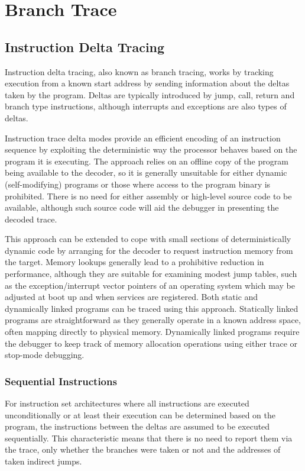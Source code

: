 \chapter{Branch Trace} \label{Branch Trace}


\section{Instruction Delta Tracing} \label{Delta Tracing}

Instruction delta tracing, also known as branch tracing, works by
tracking execution from a known start address by sending information
about the deltas taken by the program. Deltas are typically introduced
by jump, call, return and branch type instructions, although
interrupts and exceptions are also types of deltas.

Instruction trace delta modes provide an efficient encoding of an
instruction sequence by exploiting the deterministic way the processor
behaves based on the program it is executing. The approach relies on
an offline copy of the program being available to the decoder, so it
is generally unsuitable for either dynamic (self-modifying) programs
or those where access to the program binary is prohibited. There is no
need for either assembly or high-level source code to be available,
although such source code will aid the debugger in presenting the
decoded trace.

This approach can be extended to cope with small sections of
deterministically dynamic code by arranging for the decoder to request
instruction memory from the target. Memory lookups generally lead to a
prohibitive reduction in performance, although they are suitable for
examining modest jump tables, such as the exception/interrupt vector
pointers of an operating system which may be adjusted at boot up and
when services are registered.  Both static and dynamically linked
programs can be traced using this approach. Statically linked programs
are straightforward as they generally operate in a known address
space, often mapping directly to physical memory. Dynamically linked
programs require the debugger to keep track of memory allocation
operations using either trace or stop-mode debugging.

\subsection{Sequential Instructions} \label{Sequential Instructions}

For instruction set architectures where all instructions are executed
unconditionally or at least their execution can be determined based on
the program, the instructions between the deltas are assumed to be
executed sequentially. This characteristic means that there is no need
to report them via the trace, only whether the branches were taken or not
and the addresses of taken indirect jumps.

